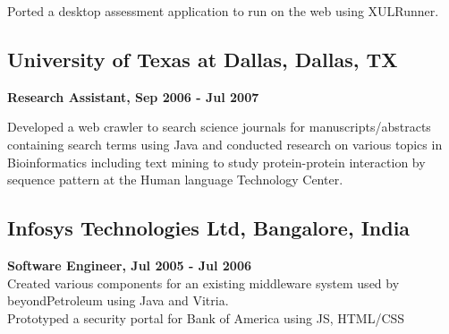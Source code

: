 \documentclass{article}
\begin{document}
\begin{minipage}[t]{3.8in}
      Ported a desktop assessment application to run on the web using XULRunner. 
      
      \subsection*{University of Texas at Dallas, Dallas, TX }
      
      {\bf Research Assistant, Sep 2006 - Jul 2007}
  
      Developed a web crawler to search science journals for manuscripts/abstracts containing search terms using Java and conducted research on various topics in Bioinformatics including text mining to study protein-protein interaction by sequence pattern at the Human language Technology Center. 
      
      \subsection*{Infosys Technologies Ltd, Bangalore, India }
      
      {\bf Software Engineer, Jul 2005 - Jul 2006} \\
      Created various components for an existing middleware system used by beyondPetroleum using Java and Vitria. \\
      Prototyped a security portal for Bank of America using JS, HTML/CSS
\end{minipage}
\hfill
\end{document}
